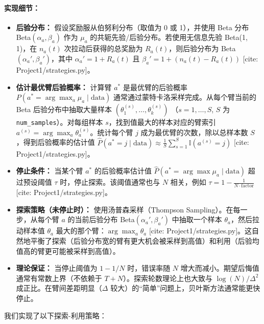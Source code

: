 \documentclass[8pt, a4paper]{ctexart} %
\begin{document}
\paragraph{实现细节：}
\begin{itemize}
    \item \textbf{后验分布：} 假设奖励服从伯努利分布（取值为 0 或 1），并使用 Beta 分布 Beta$(\alpha_a, \beta_a)$ 作为 $\mu_a$ 的共轭先验/后验分布。若使用无信息先验 Beta(1, 1)，在 $n_a(t)$ 次拉动后获得的总奖励为 $R_a(t)$，则后验分布为 Beta$(\alpha_a', \beta_a')$，其中 $\alpha_a' = 1 + R_a(t)$ 且 $\beta_a' = 1 + (n_a(t) - R_a(t))$ [cite: Project1/strategies.py]。
    \item \textbf{估计最优臂后验概率：} 计算臂 $a^*$ 是最优臂的后验概率 $P(a^* = \arg\max_a \mu_a \mid \text{data})$ 通常通过蒙特卡洛采样完成。从每个臂当前的 Beta 后验分布中抽取大量样本 $(\theta_1^{(s)}, \dots, \theta_k^{(s)})$ （$s=1, \dots, S$, $S$ 为 \texttt{num\_samples}）。对每组样本 $s$，找到值最大的样本对应的臂索引 $a^{(s)} = \arg\max_a \theta_a^{(s)}$。统计每个臂 $j$ 成为最优臂的次数，除以总样本数 $S$，得到后验概率的估计值 $\hat{P}(a^*=j \mid \text{data}) \approx \frac{1}{S} \sum_{s=1}^S \mathbb{I}(a^{(s)} = j)$ [cite: Project1/strategies.py]。
    \item \textbf{停止条件：} 当某个臂 $a^*$ 的后验概率估计值 $\hat{P}(a^* = \arg\max \mu_a \mid \text{data})$ 超过预设阈值 $\tau$ 时，停止探索。该阈值通常也与 $N$ 相关，例如 $\tau = 1 - \frac{1}{N \cdot \text{factor}}$ [cite: Project1/strategies.py]。
    \item \textbf{探索策略（未停止时）：} 使用汤普森采样（Thompson Sampling）。在每一步，从每个臂 $a$ 的当前后验分布 Beta$(\alpha_a', \beta_a')$ 中抽取一个样本 $\theta_a$，然后拉动样本值 $\theta_a$ 最大的那个臂：$\arg\max_a \theta_a$ [cite: Project1/strategies.py]。这自然地平衡了探索（后验分布宽的臂有更大机会被采样到高值）和利用（后验均值高的臂更可能被采样到高值）。
    \item \textbf{理论保证：} 当停止阈值为 $1-1/N$ 时，错误率随 $N$ 增大而减小。期望后悔值通常有常数上界（不依赖于 $T+N$）。探索轮数理论上也大致与 $\log(N)/\Delta^2$ 成正比。在臂间差距明显（$\Delta$ 较大）的“简单”问题上，贝叶斯方法通常能更快停止。
\end{itemize}



我们实现了以下探索-利用策略：
\end{document}
